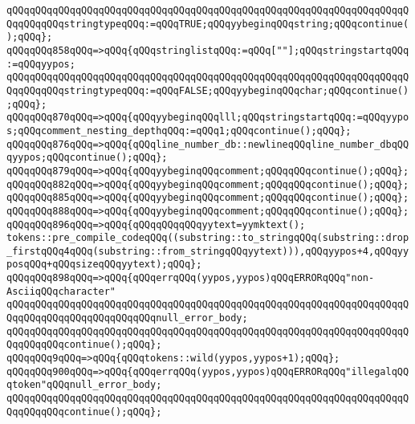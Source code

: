 \verb|qQQqqQQqqQQqqQQqqQQqqQQqqQQqqQQqqQQqqQQqqQQqqQQqqQQqqQQqqQQqqQQqqQQqqQQqqQQqqQQqstringtypeqQQq:=qQQqTRUE;qQQqyybeginqQQqstring;qQQqcontinue();qQQq};|\newline
\verb|qQQqqQQq858qQQq=>qQQq{qQQqstringlistqQQq:=qQQq[""];qQQqstringstartqQQq:=qQQqyypos;|\newline
\verb|qQQqqQQqqQQqqQQqqQQqqQQqqQQqqQQqqQQqqQQqqQQqqQQqqQQqqQQqqQQqqQQqqQQqqQQqqQQqqQQqstringtypeqQQq:=qQQqFALSE;qQQqyybeginqQQqchar;qQQqcontinue();qQQq};|\newline
\verb|qQQqqQQq870qQQq=>qQQq{qQQqyybeginqQQqlll;qQQqstringstartqQQq:=qQQqyypos;qQQqcomment_nesting_depthqQQq:=qQQq1;qQQqcontinue();qQQq};|\newline
\verb|qQQqqQQq876qQQq=>qQQq{qQQqline_number_db::newlineqQQqline_number_dbqQQqyypos;qQQqcontinue();qQQq};|\newline
\verb|qQQqqQQq879qQQq=>qQQq{qQQqyybeginqQQqcomment;qQQqqQQqcontinue();qQQq};|\newline
\verb|qQQqqQQq882qQQq=>qQQq{qQQqyybeginqQQqcomment;qQQqqQQqcontinue();qQQq};|\newline
\verb|qQQqqQQq885qQQq=>qQQq{qQQqyybeginqQQqcomment;qQQqqQQqcontinue();qQQq};|\newline
\verb|qQQqqQQq888qQQq=>qQQq{qQQqyybeginqQQqcomment;qQQqqQQqcontinue();qQQq};|\newline
\verb|qQQqqQQq896qQQq=>qQQq{qQQqqQQqqQQqyytext=yymktext();|\newline
\verb|tokens::pre_compile_codeqQQq((substring::to_stringqQQq(substring::drop_firstqQQq4qQQq(substring::from_stringqQQqyytext))),qQQqyypos+4,qQQqyyposqQQq+qQQqsizeqQQqyytext);qQQq};|\newline
\verb|qQQqqQQq898qQQq=>qQQq{qQQqerrqQQq(yypos,yypos)qQQqERRORqQQq"non-AsciiqQQqcharacter"|\newline
\verb|qQQqqQQqqQQqqQQqqQQqqQQqqQQqqQQqqQQqqQQqqQQqqQQqqQQqqQQqqQQqqQQqqQQqqQQqqQQqqQQqqQQqqQQqqQQqqQQqnull_error_body;|\newline
\verb|qQQqqQQqqQQqqQQqqQQqqQQqqQQqqQQqqQQqqQQqqQQqqQQqqQQqqQQqqQQqqQQqqQQqqQQqqQQqqQQqcontinue();qQQq};|\newline
\verb|qQQqqQQq9qQQq=>qQQq{qQQqtokens::wild(yypos,yypos+1);qQQq};|\newline
\verb|qQQqqQQq900qQQq=>qQQq{qQQqerrqQQq(yypos,yypos)qQQqERRORqQQq"illegalqQQqtoken"qQQqnull_error_body;|\newline
\verb|qQQqqQQqqQQqqQQqqQQqqQQqqQQqqQQqqQQqqQQqqQQqqQQqqQQqqQQqqQQqqQQqqQQqqQQqqQQqqQQqcontinue();qQQq};|\newline
